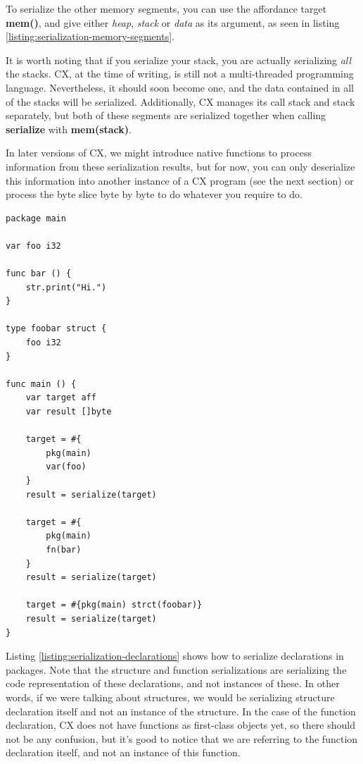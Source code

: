 \documentclass[11pt,fleqn,openany]{book} %
\begin{document}
To serialize the other memory segments, you can use the affordance target \textbf{mem()}, and give either \emph{heap}, \emph{stack} or \emph{data} as its argument, as seen in listing \ref{listing:serialization-memory-segments}.

It is worth noting that if you serialize your stack, you are actually serializing \emph{all} the stacks. CX, at the time of writing, is still not a multi-threaded programming language. Nevertheless, it should soon become one, and the data contained in all of the stacks will be serialized. Additionally, CX manages its call stack and stack separately, but both of these segments are serialized together when calling \textbf{serialize} with \textbf{mem(stack)}.

In later versions of CX, we might introduce native functions to process information from these serialization results, but for now, you can only deserialize this information into another instance of a CX program (see the next section) or process the byte slice byte by byte to do whatever you require to do.

\begin{lstlisting}[caption={Serialization of declarations},captionpos=b,label={listing:serialization-declarations}]
package main

var foo i32

func bar () {
    str.print("Hi.")
}

type foobar struct {
    foo i32
}

func main () {
    var target aff
    var result []byte

    target = #{
        pkg(main)
        var(foo)
    }
    result = serialize(target)
    
    target = #{
        pkg(main)
        fn(bar)
    }
    result = serialize(target)
    
    target = #{pkg(main) strct(foobar)}
    result = serialize(target)
}
\end{lstlisting}

Listing \ref{listing:serialization-declarations} shows how to serialize declarations in packages. Note that the structure and function serializations are serializing the code representation of these declarations, and not instances of these. In other words, if we were talking about structures, we would be serializing structure declaration itself and not an instance of the structure. In the case of the function declaration, CX does not have functions as first-class objects yet, so there should not be any confusion, but it's good to notice that we are referring to the function declaration itself, and not an instance of this function.
\end{document}
